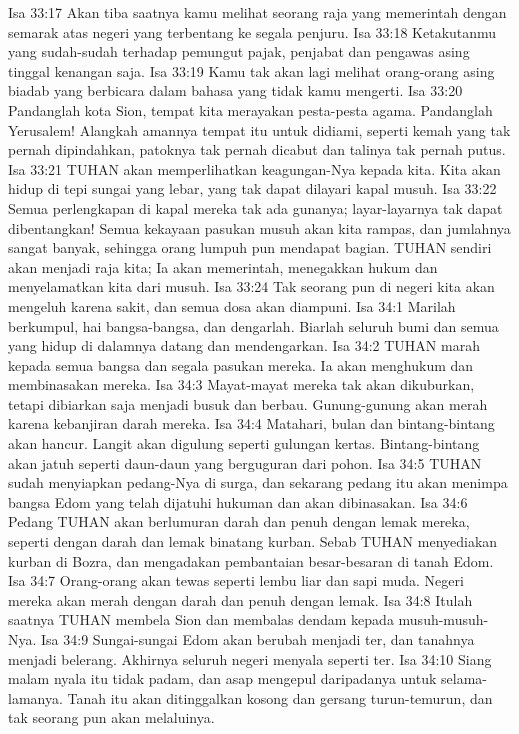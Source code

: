 Isa 33:17  Akan tiba saatnya kamu melihat seorang raja yang memerintah dengan semarak atas negeri yang terbentang ke segala penjuru.
Isa 33:18  Ketakutanmu yang sudah-sudah terhadap pemungut pajak, penjabat dan pengawas asing tinggal kenangan saja.
Isa 33:19  Kamu tak akan lagi melihat orang-orang asing biadab yang berbicara dalam bahasa yang tidak kamu mengerti.
Isa 33:20  Pandanglah kota Sion, tempat kita merayakan pesta-pesta agama. Pandanglah Yerusalem! Alangkah amannya tempat itu untuk didiami, seperti kemah yang tak pernah dipindahkan, patoknya tak pernah dicabut dan talinya tak pernah putus.
Isa 33:21  TUHAN akan memperlihatkan keagungan-Nya kepada kita. Kita akan hidup di tepi sungai yang lebar, yang tak dapat dilayari kapal musuh.
Isa 33:22  Semua perlengkapan di kapal mereka tak ada gunanya; layar-layarnya tak dapat dibentangkan! Semua kekayaan pasukan musuh akan kita rampas, dan jumlahnya sangat banyak, sehingga orang lumpuh pun mendapat bagian. TUHAN sendiri akan menjadi raja kita; Ia akan memerintah, menegakkan hukum dan menyelamatkan kita dari musuh.
Isa 33:24  Tak seorang pun di negeri kita akan mengeluh karena sakit, dan semua dosa akan diampuni.
Isa 34:1  Marilah berkumpul, hai bangsa-bangsa, dan dengarlah. Biarlah seluruh bumi dan semua yang hidup di dalamnya datang dan mendengarkan.
Isa 34:2  TUHAN marah kepada semua bangsa dan segala pasukan mereka. Ia akan menghukum dan membinasakan mereka.
Isa 34:3  Mayat-mayat mereka tak akan dikuburkan, tetapi dibiarkan saja menjadi busuk dan berbau. Gunung-gunung akan merah karena kebanjiran darah mereka.
Isa 34:4  Matahari, bulan dan bintang-bintang akan hancur. Langit akan digulung seperti gulungan kertas. Bintang-bintang akan jatuh seperti daun-daun yang berguguran dari pohon.
Isa 34:5  TUHAN sudah menyiapkan pedang-Nya di surga, dan sekarang pedang itu akan menimpa bangsa Edom yang telah dijatuhi hukuman dan akan dibinasakan.
Isa 34:6  Pedang TUHAN akan berlumuran darah dan penuh dengan lemak mereka, seperti dengan darah dan lemak binatang kurban. Sebab TUHAN menyediakan kurban di Bozra, dan mengadakan pembantaian besar-besaran di tanah Edom.
Isa 34:7  Orang-orang akan tewas seperti lembu liar dan sapi muda. Negeri mereka akan merah dengan darah dan penuh dengan lemak.
Isa 34:8  Itulah saatnya TUHAN membela Sion dan membalas dendam kepada musuh-musuh-Nya.
Isa 34:9  Sungai-sungai Edom akan berubah menjadi ter, dan tanahnya menjadi belerang. Akhirnya seluruh negeri menyala seperti ter.
Isa 34:10  Siang malam nyala itu tidak padam, dan asap mengepul daripadanya untuk selama-lamanya. Tanah itu akan ditinggalkan kosong dan gersang turun-temurun, dan tak seorang pun akan melaluinya.
